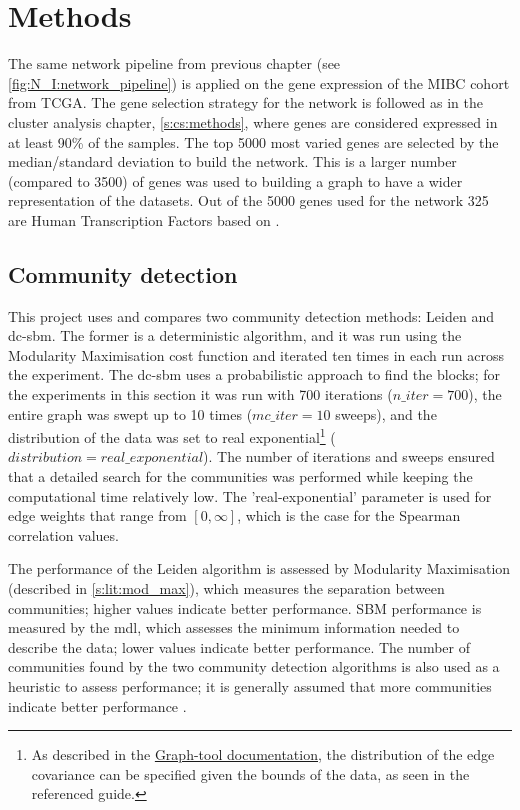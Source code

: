 \section{Methods}


The same network pipeline from previous chapter (see \cref{fig:N_I:network_pipeline}) is applied on the gene expression of the MIBC cohort from TCGA. The gene selection strategy for the network is followed as in the cluster analysis chapter, \cref{s:cs:methods}, where genes are considered expressed in at least 90\% of the samples. The top 5000 most varied genes are selected by the median/standard deviation to build the network. This is a larger number (compared to 3500) of genes was used to building a graph to have a wider representation of the datasets. Out of the 5000 genes used for the network 325 are Human Transcription Factors based on \citet{Lambert2018-el}.
 
\subsection*{Community detection} \label{s:N_I:sel_tfs_methods_comm_detection}

This project uses and compares two community detection methods: Leiden and \acrfull{dc-sbm}. The former is a deterministic algorithm, and it was run using the Modularity Maximisation cost function and iterated ten times in each run across the experiment. The \acrshort{dc-sbm} uses a probabilistic approach to find the blocks; for the experiments in this section it was run with 700 iterations ($n\_iter=700$), the entire graph was swept up to 10 times ($mc\_iter=10$ sweeps), and the distribution of the data was set to real exponential\footnote{As described in the \href{https://graph-tool.skewed.de/static/doc/demos/inference/inference.html}{Graph-tool documentation}, the distribution of the edge covariance can be specified given the bounds of the data, as seen in the referenced guide.} ($distribution=real\_exponential$). The number of iterations and sweeps ensured that a detailed search for the communities was performed while keeping the computational time relatively low. The 'real-exponential' parameter is used for edge weights that range from $[0, \infty]$, which is the case for the Spearman correlation values.

The performance of the Leiden algorithm is assessed by Modularity Maximisation (described in \cref{s:lit:mod_max}), which measures the separation between communities; higher values indicate better performance. SBM performance is measured by the \acrfull{mdl}, which assesses the minimum information needed to describe the data; lower values indicate better performance. The number of communities found by the two community detection algorithms is also used as a heuristic to assess performance; it is generally assumed that more communities indicate better performance \citep{Care2019-ij}.

